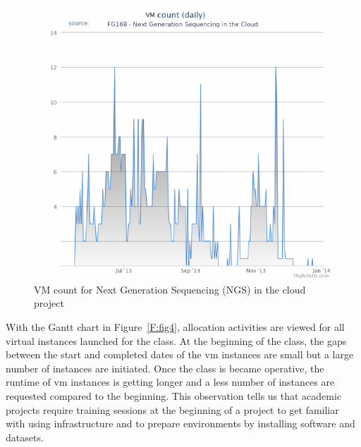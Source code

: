 \documentclass{sig-alternate-05-2015}
\begin{document}

\begin{figure}[h!] 
  \centering 
    \includegraphics[width=1.0\columnwidth]{images/fig2.pdf} 
  \caption{VM count for Next Generation Sequencing (NGS) in the cloud project}\label{F:fig3} 
\end{figure} 

With the Gantt chart in Figure~\ref{F:fig4}, allocation activities are viewed for all virtual instances launched for the class. At the beginning of the class, the gaps between the start and completed dates of the vm instances are small but a large number of instances are initiated. Once the class is became operative, the runtime of vm instances is getting longer and a less number of instances are requested compared to the beginning. This observation tells us that academic projects require training sessions at the beginning of a project to get familiar with using infrastructure and to prepare environments by installing software and datasets.
\end{document}
